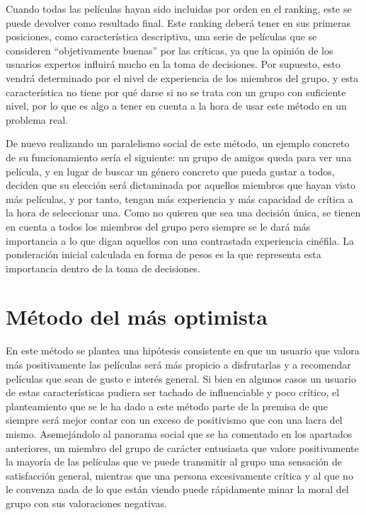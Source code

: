 Cuando todas las películas hayan sido incluidas por orden en el ranking, este se puede devolver como resultado final. Este ranking deberá tener en sus primeras posiciones, como característica descriptiva, una serie de películas que se consideren ``objetivamente buenas'' por las críticas, ya que la opinión de los usuarios expertos influirá mucho en la toma de decisiones. Por supuesto, esto vendrá determinado por el nivel de experiencia de los miembros del grupo, y esta característica no tiene por qué darse si no se trata con un grupo con suficiente nivel, por lo que es algo a tener en cuenta a la hora de usar este método en un problema real.

De nuevo realizando un paralelismo social de este método, un ejemplo concreto de su funcionamiento sería el siguiente: un grupo de amigos queda para ver una película, y en lugar de buscar un género concreto que pueda gustar a todos, deciden que su elección será dictaminada por aquellos miembros que hayan visto más películas, y por tanto, tengan más experiencia y más capacidad de crítica a la hora de seleccionar una. Como no quieren que sea una decisión única, se tienen en cuenta a todos los miembros del grupo pero siempre se le dará más importancia a lo que digan aquellos con una contrastada experiencia cinéfila. La ponderación inicial calculada en forma de pesos es la que representa esta importancia dentro de la toma de decisiones.

\section{Método del más optimista}

En este método se plantea una hipótesis consistente en que un usuario que valora más positivamente las películas será más propicio a disfrutarlas y a recomendar películas que sean de gusto e interés general. Si bien en algunos casos un usuario de estas características pudiera ser tachado de influenciable y poco crítico, el planteamiento que se le ha dado a este método parte de la premisa de que siempre será mejor contar con un exceso de positivismo que con una lacra del mismo. Asemejándolo al panorama social que se ha comentado en los apartados anteriores, un miembro del grupo de carácter entusiasta que valore positivamente la mayoría de las películas que ve puede transmitir al grupo una sensación de satisfacción general, mientras que una persona excesivamente crítica y al que no le convenza nada de lo que están viendo puede rápidamente minar la moral del grupo con sus valoraciones negativas.

